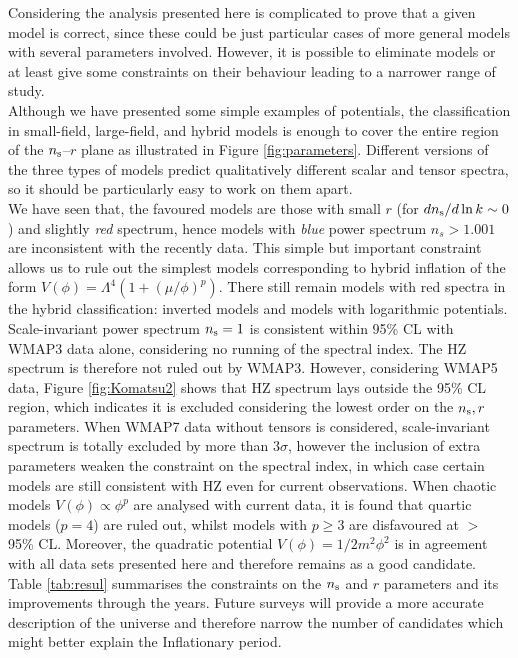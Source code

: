 \documentclass{rmaa}
\begin{document}
Considering the analysis presented here is complicated to prove 
that a given model is correct, since these could be just particular cases of more general 
models with several parameters involved. However, it is possible to eliminate models 
or at least give some constraints on their behaviour leading to a narrower range of study.
\\

Although we have presented some simple examples of potentials, 
the classification in small-field, large-field, and hybrid models is enough to 
cover the entire region of the $n_{\rm s}$--$r$ plane as illustrated in Figure \ref{fig:parameters}.  
Different versions of the three types of models predict qualitatively different
scalar and tensor spectra, so it should be particularly easy to work on
them apart.
\\

We have seen that, the favoured models are those with small $r$ (for $dn_{\rm s}/d\ln{k}\sim 0$)
and slightly \textit{red} spectrum, hence models with \textit{blue} power spectrum  $n_s > 1.001$
are inconsistent with the recently data. This simple but important constraint allows us to rule out
the simplest models corresponding to hybrid inflation of the form 
$V(\phi) = \Lambda^4(1 + (\mu / \phi)^{p})$. There still remain models with red spectra in 
the hybrid classification: inverted models and models with logarithmic potentials. 
\\

Scale-invariant power spectrum $n_{\rm s} = 1$ is consistent within 95\% CL with WMAP3 data 
alone, considering no running of the spectral index. The HZ spectrum 
is therefore not ruled out by WMAP3. However, considering WMAP5 data, 
Figure \ref{fig:Komatsu2} shows that HZ spectrum lays outside 
the 95\% CL region, which indicates it is excluded considering the lowest order 
on the $n_{\rm s}, r$ parameters. When WMAP7 data without tensors is considered, 
scale-invariant spectrum is totally excluded by more than $3 \sigma$, 
 however the inclusion of extra parameters weaken the constraint on the spectral index, in which case 
certain models are still consistent with HZ  even for current observations. 
When chaotic models $V(\phi)\propto\phi^p$ are analysed with current data, 
it is found that quartic models 
($p=4$) are ruled out, whilst models with $p\ge3$ are disfavoured at $>$ 95\% CL.
Moreover, the quadratic potential $V(\phi)= 1/2 m^2 \phi^2$ is in agreement
with all data sets presented here and therefore remains as a good candidate.
Table \ref{tab:resul} summarises the constraints on the $n_{\rm s}$ and $r$ parameters
and its improvements through the years.
Future surveys will  provide a more accurate description of the universe and therefore 
narrow the number of candidates which might better explain the Inflationary period.
\end{document}

